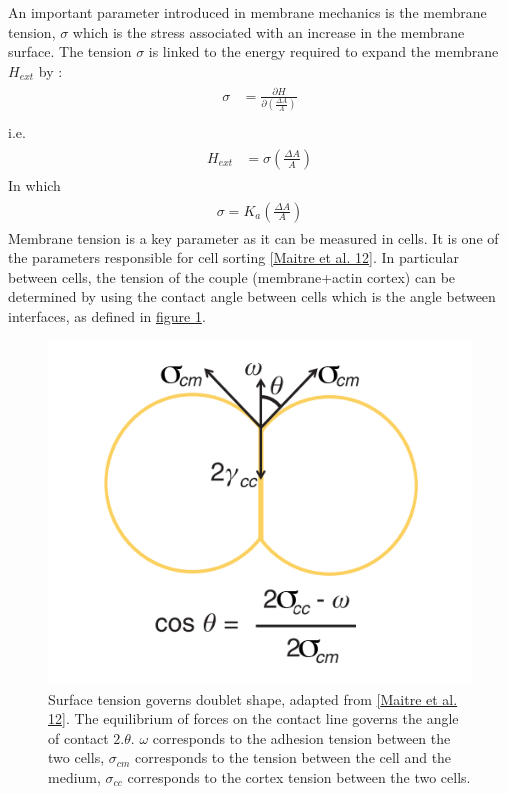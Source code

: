\documentclass[A4paperpaper,11pt,english]{sphinxmanual}
\begin{document}
An important parameter introduced in membrane mechanics is the  membrane tension,
\(\sigma\) which is the stress associated with an increase in the membrane surface.
The tension \(\sigma\) is linked to the energy required to expand the membrane \(H_{ext}\) by :
\label{parts/part1:equation-eqa4}\begin{gather}
\begin{split}\sigma &= \frac {\partial H} {\partial \left(\frac{\Delta A}{A}\right)} \\\end{split}\label{parts/part1-eqa4}
\end{gather}
i.e.
\label{parts/part1:equation-eqa5}\begin{gather}
\begin{split}H_{ext} &= \sigma\left( \frac {\Delta A} A \right)\end{split}\label{parts/part1-eqa5}
\end{gather}
In which
\label{parts/part1:equation-eqa6a}\begin{gather}
\begin{split}\sigma =  K_a \left( \frac {\Delta A} A \right)\end{split}\label{parts/part1-eqa6a}
\end{gather}
Membrane tension is a key parameter as it can be measured in cells. It is one
of the parameters responsible for cell sorting {\hyperref[parts/part1:maitre2012]{{[}Maitre et al. 12{]}}}. In particular
between cells, the tension of the couple (membrane+actin cortex) can be
determined by using the contact angle between cells which is the angle between
interfaces, as defined in \hyperref[parts/part1:fig-tension-cell]{figure  \ref*{parts/part1:fig-tension-cell}}.
\begin{figure}[htbp]
\centering
\capstart

\includegraphics[width=0.400\linewidth]{Cell-Surface-tension.png}
\caption{Surface tension governs doublet shape,  adapted from {\hyperref[parts/part1:maitre2012]{{[}Maitre et al. 12{]}}}.
The equilibrium of forces on the contact line governs the angle of contact
\(2.\theta\). \(\omega\) corresponds to the adhesion tension between
the two cells, \(\sigma_{cm}\) corresponds  to the tension between
the cell and the medium, \(\sigma_{cc}\) corresponds to the cortex
tension between the two cells.}\label{parts/part1:fig-tension-cell}\end{figure}
\end{document}
